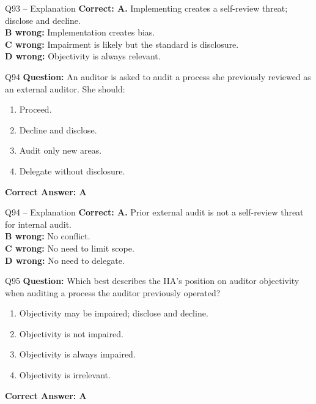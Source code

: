 \documentclass[aspectratio=169,10pt]{beamer}
\begin{document}
	\begin{frame}[t]{Q93 -- Explanation}
		\small
		\textbf{Correct: A.} Implementing creates a self-review threat; disclose and decline. \\[4pt]
		\textbf{B wrong:} Implementation creates bias. \\[2pt]
		\textbf{C wrong:} Impairment is likely but the standard is disclosure. \\[2pt]
		\textbf{D wrong:} Objectivity is always relevant.
	\end{frame}
	
	\begin{frame}[t]{Q94}
		\small
		\textbf{Question:} An auditor is asked to audit a process she previously reviewed as an external auditor. She should:
		\begin{enumerate}[label=\Alph*.,itemsep=1pt,topsep=2pt]
			\item Proceed.
			\item Decline and disclose.
			\item Audit only new areas.
			\item Delegate without disclosure.
		\end{enumerate}
		\vspace{4pt}
		\textbf{Correct Answer: A}
	\end{frame}
	
	\begin{frame}[t]{Q94 -- Explanation}
		\small
		\textbf{Correct: A.} Prior external audit is not a self-review threat for internal audit. \\[4pt]
		\textbf{B wrong:} No conflict. \\[2pt]
		\textbf{C wrong:} No need to limit scope. \\[2pt]
		\textbf{D wrong:} No need to delegate.
	\end{frame}
	
	\begin{frame}[t]{Q95}
		\small
		\textbf{Question:} Which best describes the IIA's position on auditor objectivity when auditing a process the auditor previously operated?
		\begin{enumerate}[label=\Alph*.,itemsep=1pt,topsep=2pt]
			\item Objectivity may be impaired; disclose and decline.
			\item Objectivity is not impaired.
			\item Objectivity is always impaired.
			\item Objectivity is irrelevant.
		\end{enumerate}
		\vspace{4pt}
		\textbf{Correct Answer: A}
	\end{frame}
	
\end{document}
